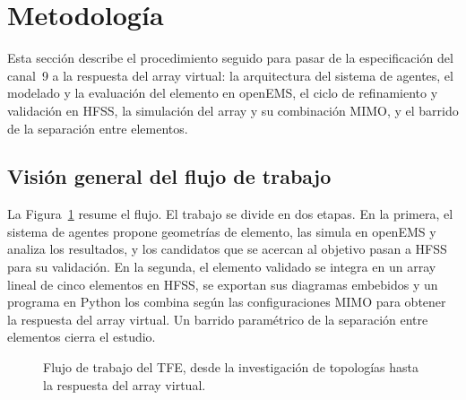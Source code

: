 \documentclass[11pt,a4paper]{article}
\begin{document}
\section{Metodología}\label{sec:metodologia}
Esta sección describe el procedimiento seguido para pasar de la especificación del canal~9 a la
respuesta del array virtual: la arquitectura del sistema de agentes, el modelado y la evaluación
del elemento en openEMS, el ciclo de refinamiento y validación en HFSS, la simulación del array y
su combinación MIMO, y el barrido de la separación entre elementos.

\subsection{Visión general del flujo de trabajo}\label{sec:flujo}
La Figura~\ref{fig:flujo} resume el flujo. El trabajo se divide en dos etapas. En la primera, el
sistema de agentes propone geometrías de elemento, las simula en openEMS y analiza los resultados,
y los candidatos que se acercan al objetivo pasan a HFSS para su validación. En la segunda, el
elemento validado se integra en un array lineal de cinco elementos en HFSS, se exportan sus diagramas
embebidos y un programa en Python los combina según las configuraciones MIMO para obtener la
respuesta del array virtual. Un barrido paramétrico de la separación entre elementos cierra el
estudio.

\begin{figure}[H]
    \centering
    \caption{Flujo de trabajo del TFE, desde la investigación de topologías hasta la respuesta
    del array virtual.}
    \label{fig:flujo}
\end{figure}
\end{document}
